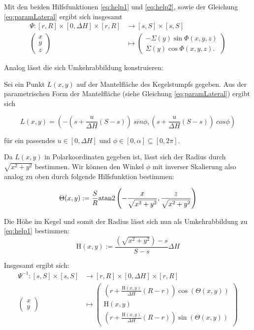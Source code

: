 Mit den beiden Hilfsfunktionen \ref{eq:help1} und \ref{eq:help2}, sowie der Gleichung \ref{eq:paramLateral} ergibt sich insgesamt
\begin{equation}\label{eq:coneToLateral}
\begin{aligned}
\Psi \colon [r,R] \times [0, \Delta H] \times [r,R] &\to [s,S] \times [s,S]\\
\begin{pmatrix}
x \\ y \\ z
\end{pmatrix}  &\mapsto
\begin{pmatrix}
-\Sigma(y)\sin \Phi(x,y,z)\\
 \Sigma(y)\cos\Phi(x,y,z).
\end{pmatrix}
\end{aligned}
\end{equation}

Analog lässt die sich Umkehrabbildung konstruieren:

Sei ein Punkt $L(x,y)$ auf der Mantelfläche des Kegelstumpfs gegeben. Aus der parametrischen Form der Mantelfläche (siehe Gleichung \ref{eq:paramLateral}) ergibt sich

\[
L(x,y) = (-(s + \frac{u}{\Delta H}(S-s)) ~sin \phi, (s + \frac{u}{\Delta H} (S-s)) ~cos \phi)
\]

für ein passendes $u\in [0, \Delta H]$ und $\phi \in [0, \alpha] \subseteq  [0, 2\pi]$.

Da $L(x,y)$ in Polarkoordinaten gegeben ist, lässt sich der Radius durch $\sqrt{x^2+y^2}$ bestimmen. Wir können den Winkel $\phi$ mit inverser Skalierung also analog zu oben durch folgende Hilfsfunktion bestimmen:

\begin{equation}\label{eq:help3}
\Theta(x,y) := \frac{S}{R} \text{atan2}\left(-\frac{x}{\sqrt{x^2+y^2}}, \frac{z}{\sqrt{x^2+y^2}}\right)
\end{equation}

Die Höhe  im Kegel und somit der Radius lässt sich nun als Umkehrabbildung zu \ref{eq:help1} bestimmen:
\begin{equation}\label{eq:help4}
\mathrm{H}(x,y) := \frac{\left(\sqrt{x^2+y^2}\right) - s}{S - s}\Delta H
\end{equation}

Insgesamt ergibt sich:
\begin{equation}\label{eq:LateralToCone}
\begin{aligned}
\Psi^{-1} \colon  [s,S]\times[s,S] &\to [r,R] \times [0, \Delta H] \times [r,R]\\
\begin{pmatrix}
x \\ y
\end{pmatrix} &\mapsto
\begin{pmatrix}
\left( r + \frac{\mathrm{H}(x,y)}{\Delta H} (R - r)\right)\cos\left(\Theta(x,y) \right) \\
\mathrm{H}(x,y)\\
\left( r + \frac{\mathrm{H}(x,y)}{\Delta H} (R - r)\right)\sin\left(\Theta(x,y) \right)
\end{pmatrix}
\end{aligned}
\end{equation}


